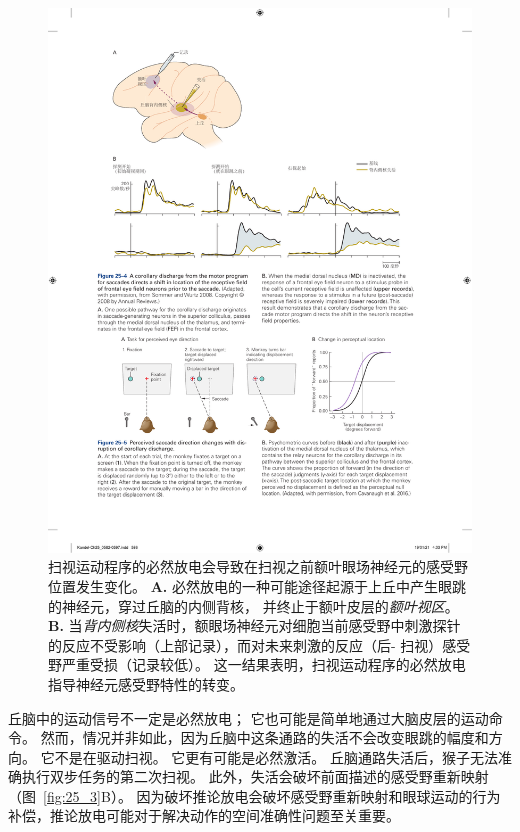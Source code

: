 \begin{figure}[htbp]
	\centering
	\includegraphics[width=1.0\linewidth]{chap25/fig_25_4}
	\caption{扫视运动程序的必然放电会导致在扫视之前额叶眼场神经元的感受野位置发生变化\cite{sommer2008brain}。
		\textbf{A.} 必然放电的一种可能途径起源于上丘中产生眼跳的神经元，穿过丘脑的内侧背核， 并终止于额叶皮层的\textit{额叶视区}。
		\textbf{B.} 当\textit{背内侧核}失活时，额眼场神经元对细胞当前感受野中刺激探针的反应不受影响（上部记录），而对未来刺激的反应（后- 扫视）感受野严重受损（记录较低）。
		这一结果表明，扫视运动程序的必然放电指导神经元感受野特性的转变。}
	\label{fig:25_4}
\end{figure}


丘脑中的运动信号不一定是必然放电；
它也可能是简单地通过大脑皮层的运动命令。
然而，情况并非如此，因为丘脑中这条通路的失活不会改变眼跳的幅度和方向。
它不是在驱动扫视。
它更有可能是必然激活。
丘脑通路失活后，猴子无法准确执行双步任务的第二次扫视。
此外，失活会破坏前面描述的感受野重新映射（图~\ref{fig:25_3}B）。
因为破坏推论放电会破坏感受野重新映射和眼球运动的行为补偿，推论放电可能对于解决动作的空间准确性问题至关重要。


